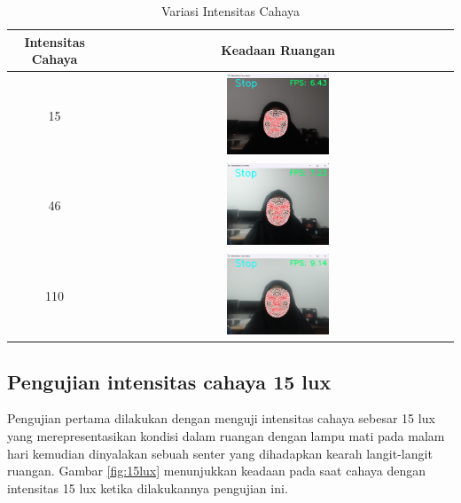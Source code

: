 \begin{table}[H]
  \centering
  \begin{tabular}{|c|c|}
  \hline
  \textbf{Intensitas Cahaya} & \textbf{Keadaan Ruangan} \\ \hline
  15 & \includegraphics[width=0.3\textwidth]{gambar/15 stop.png} \\ \hline
  46 & \includegraphics[width=0.3\textwidth]{gambar/46 stop.png} \\ \hline
  110 & \includegraphics[width=0.3\textwidth]{gambar/110 stop.png} \\ \hline
  \end{tabular}
  \caption{Variasi Intensitas Cahaya}
  \label{tab:VariasiIntensitasCahaya}
  \end{table}

\subsection{Pengujian intensitas cahaya 15 lux}
Pengujian pertama dilakukan dengan menguji intensitas cahaya sebesar 15 lux yang merepresentasikan kondisi dalam ruangan dengan lampu mati pada malam hari kemudian dinyalakan sebuah senter yang dihadapkan kearah langit-langit ruangan. Gambar \ref{fig:15lux} menunjukkan keadaan pada saat cahaya dengan intensitas 15 lux ketika dilakukannya pengujian ini.

